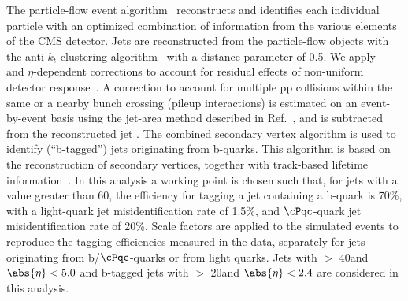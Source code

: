 The particle-flow event algorithm~\cite{CMS-PAS-PFT-09-001,CMS-PAS-PFT-10-001} reconstructs and identifies each individual particle with an optimized combination of information from the various elements of the CMS detector. 
Jets are reconstructed from the particle-flow objects with the anti-$k_t$ clustering
algorithm~\cite{Cacciari:2008gp} with a distance parameter of 0.5. We apply
\pt- and $\eta$-dependent corrections to account for residual
effects of non-uniform detector response~\cite{Chatrchyan:2011ds}.
A correction to account for multiple pp collisions within the same or a nearby
bunch crossing (pileup interactions) is estimated on an event-by-event basis using the
jet-area method described in Ref.~\cite{Cacciari:2007fd}, and is
subtracted from the reconstructed jet \pt.
The combined secondary vertex algorithm is used to identify (``b-tagged'') jets 
originating from b-quarks.  This algorithm 
 is based on the reconstruction of secondary vertices, together with track-based lifetime information~\cite{Chatrchyan:2012jua}. 
In this analysis a working point is chosen such that, for jets with a \PT value greater than 60\GeV, the efficiency for tagging a jet containing a b-quark is 70\%, with a light-quark jet misidentification rate of 1.5\%, and $\cPqc$-quark jet misidentification rate of 20\%.
Scale factors are applied to the simulated events to reproduce the tagging efficiencies measured in the data, 
separately for jets originating from b/$\cPqc$-quarks or from light quarks.
Jets with  \PT $>$ 40\GeV and $\abs{\eta} < 5.0$ and b-tagged jets with \PT $>$ 20\GeV and $\abs{\eta} < 2.4$ are considered in this analysis.


